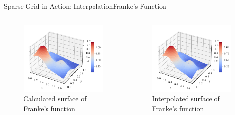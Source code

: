 \begin{frame}{Sparse Grid in Action: Interpolation}{Franke's Function}
    \begin{columns}
        \begin{column}{0.5\textwidth}
            \begin{figure}
                \centering
                \includegraphics[width=.8\textwidth]{figures/franke.pdf}
                \caption{Calculated surface of Franke's function}
            \end{figure}
        \end{column}
        \begin{column}{0.5\textwidth}
            \begin{figure}
                \centering
                \includegraphics[width=.8\textwidth]{figures/SurfacePlot_franke.pdf}
                \caption{Interpolated surface of Franke's function}
            \end{figure}
        \end{column}
    \end{columns}
\end{frame}

